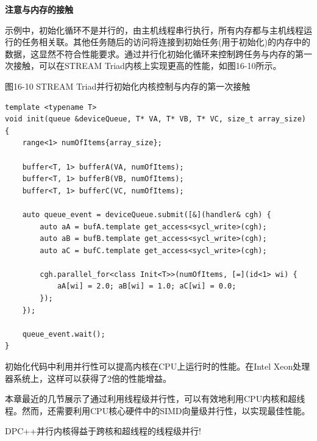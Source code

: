 \hspace*{\fill} \par %
\textbf{注意与内存的接触}

示例中，初始化循环不是并行的，由主机线程串行执行，所有内存都与主机线程运行的任务相关联。其他任务随后的访问将连接到初始任务(用于初始化)的内存中的数据，这显然不符合性能要求。通过并行化初始化循环来控制跨任务与内存的第一次接触，可以在STREAM Triad内核上实现更高的性能，如图16-10所示。\par

\hspace*{\fill} \par %
图16-10 STREAM Triad并行初始化内核控制与内存的第一次接触
\begin{lstlisting}[caption={}]
template <typename T>
void init(queue &deviceQueue, T* VA, T* VB, T* VC, size_t array_size) {
	range<1> numOfItems{array_size};
	
	buffer<T, 1> bufferA(VA, numOfItems);
	buffer<T, 1> bufferB(VB, numOfItems);
	buffer<T, 1> bufferC(VC, numOfItems);
	
	auto queue_event = deviceQueue.submit([&](handler& cgh) {
		auto aA = bufA.template get_access<sycl_write>(cgh);
		auto aB = bufB.template get_access<sycl_write>(cgh);
		auto aC = bufC.template get_access<sycl_write>(cgh);
		
		cgh.parallel_for<class Init<T>>(numOfItems, [=](id<1> wi) {
			aA[wi] = 2.0; aB[wi] = 1.0; aC[wi] = 0.0;
		});
	});

	queue_event.wait();
}
\end{lstlisting}

初始化代码中利用并行性可以提高内核在CPU上运行时的性能。在Intel Xeon处理器系统上，这样可以获得了2倍的性能增益。\par

本章最近的几节展示了通过利用线程级并行性，可以有效地利用CPU内核和超线程。然而，还需要利用CPU核心硬件中的SIMD向量级并行性，以实现最佳性能。\par

\begin{tcolorbox}[colback=blue!5!white,colframe=blue!75!black]
DPC++并行内核得益于跨核和超线程的线程级并行!
\end{tcolorbox}






